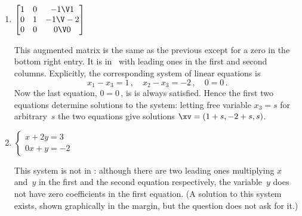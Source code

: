 \begin{example}
\begin{enumerate}
\item \(\begin{bmatrix} 1&0&-1\V1
\\0&1&-1\V-2
\\0&0&0\V0
\end{bmatrix}\)
\begin{solution} 
This augmented matrix is the same as the previous except for a zero in the bottom right entry. 
It is in \rref\ with leading ones in the first and second columns.
Explicitly, the corresponding system of linear equations is
\begin{equation*}
x_1-x_3=1\,,\quad x_2-x_3=-2\,,\quad 0=0\,.
\end{equation*}
Now the last equation, \(0=0\)\,, is is always satisfied.
Hence the first two equations determine solutions to the system: letting free variable \(x_3=s\) for arbitrary~\(s\) the two equations give solutions \(\xv=(1+s,-2+s,s)\).
%
\end{solution}

\item \(\begin{cases} x+2y=3\\ 0x+y=-2
\end{cases}\)
\begin{solution} 
This system is not in \rref: although there are two leading ones multiplying \(x\) and~\(y\) in the first and the second equation respectively, the variable~\(y\) does not have zero coefficients in the first equation.  (A solution to this system exists, shown graphically in the margin, but the question does not ask for it.)
%
\end{solution}


\end{enumerate}
\end{example}
